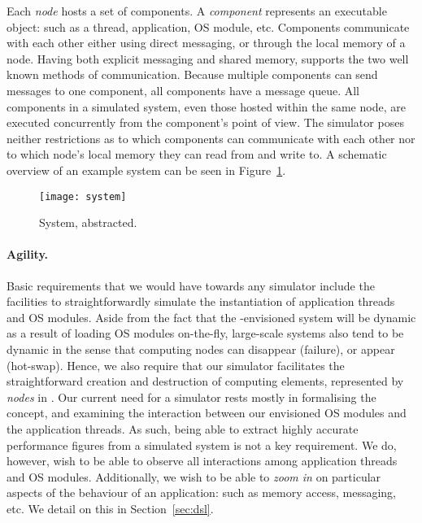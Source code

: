 Each \emph{node} hosts a set of components.
A \emph{component} represents an executable object: such as a thread, application, OS module, etc.
Components communicate with each other either using direct messaging, or through the local memory of a node.
Having both explicit messaging and shared memory, \soosim supports the two well known methods of communication.
Because multiple components can send messages to one component, all components have a message queue.
All components in a simulated system, even those hosted within the same node, are executed concurrently from the component's point of view.
The simulator poses neither restrictions as to which components can communicate with each other nor to which node's local memory they can read from and write to.
A schematic overview of an example system can be seen in Figure~\ref{fig:system}.

\begin{figure}
\centering
%
\texttt{[image: system]}
\caption{System, abstracted.}
\label{fig:system}
\end{figure}

\paragraph{Agility.}
Basic requirements that we would have towards any simulator include the facilities to straightforwardly simulate the instantiation of application threads and OS modules.
Aside from the fact that the \soos-envisioned system will be dynamic as a result of loading OS modules on-the-fly, large-scale systems also tend to be dynamic in the sense that computing nodes can disappear (failure), or
appear (hot-swap).
Hence, we also require that our simulator facilitates the straightforward creation and destruction of computing elements, represented by \emph{nodes} in \soosim.
Our current need for a simulator rests mostly in formalising the \soos concept, and examining the interaction between our envisioned OS modules and the application threads.
As such, being able to extract highly accurate performance figures from a simulated system is not a key requirement.
We do, however, wish to be able to observe all interactions among application threads and OS modules.
Additionally, we wish to be able to \emph{zoom in} on particular aspects of the behaviour of an application: such as memory access, messaging, etc.
We detail on this in Section~\ref{sec:dsl}.

